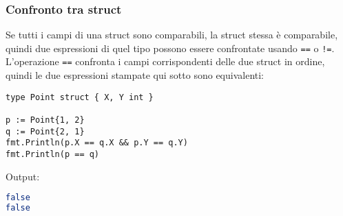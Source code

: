 \documentclass[../../../thesis.tex]{subfiles}
\begin{document}
    \subsubsection{Confronto tra struct}
    Se tutti i campi di una struct sono comparabili, la struct stessa è comparabile, quindi due espressioni di quel tipo possono essere confrontate usando \verb"==" o \verb"!=".
    L'operazione \verb"==" confronta i campi corrispondenti delle due struct in ordine, quindi le due espressioni stampate qui sotto sono equivalenti:
    \begin{lstlisting}[frame = single, label = {lst:lstlisting3-4-2.1}]
type Point struct { X, Y int }

p := Point{1, 2}
q := Point{2, 1}
fmt.Println(p.X == q.X && p.Y == q.Y)
fmt.Println(p == q)
    \end{lstlisting}
    Output:
    \begin{lstlisting}[language = bash, frame = L, label = {lst:lstlisting3-4-2.2}]
false
false
    \end{lstlisting}
\end{document}
